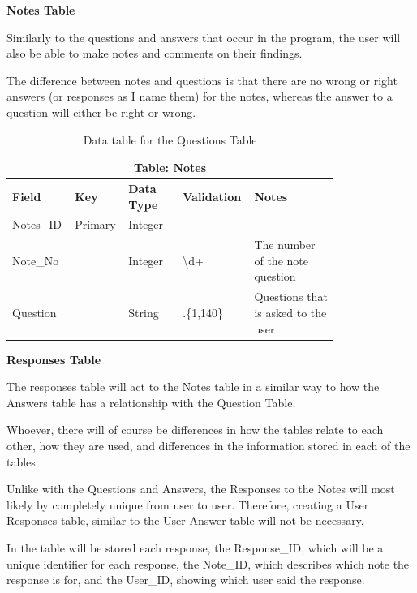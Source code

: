 \documentclass[12pt]{article}
\begin{document}
\clearpage
\textbf{Notes Table}

Similarly to the questions and answers that occur in the program, the user will also be able to make notes and comments on their findings.

The difference between notes and questions is that there are no wrong or right answers (or responses as I name them) for the notes, whereas the answer to a question will either be right or wrong.

\begin{table}[ht]
    \centering
    \begin{tabular}{ | p{0.15\linewidth} | p{0.1\linewidth} | p{0.16\linewidth} | p{0.14\linewidth} | p{0.25\linewidth} | }
    \hline
    \multicolumn{5}{|c|}{\textbf{Table: Notes}}\\
    \hline
    \hline
    \textbf{Field} & \textbf{Key} & \textbf{Data Type} & \textbf{Validation} & \textbf{Notes} \\
    \hline
    Notes\_ID & Primary & Integer & & \\
    \hline
    Note\_No & & Integer & \textbackslash d+ & The number of the note question\\
    \hline
    Question & & String & .\{1,140\} & Questions that is asked to the user\\
    \hline
    \end{tabular}
    \caption{Data table for the Questions Table}
\end{table}

\textbf{Responses Table}

The responses table will act to the Notes table in a similar way to how the Answers table has a relationship with the Question Table.

Whoever, there will of course be differences in how the tables relate to each other, how they are used, and differences in the information stored in each of the tables.

Unlike with the Questions and Answers, the Responses to the Notes will most likely by completely unique from user to user. Therefore, creating a User Responses table, similar to the User Answer table will not be necessary.

In the table will be stored each response, the Response\_ID, which will be a unique identifier for each response, the Note\_ID, which describes which note the response is for, and the User\_ID, showing which user said the response.
\end{document}
